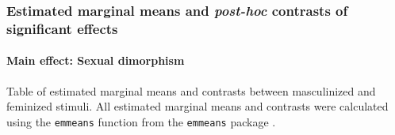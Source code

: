 \documentclass[
  bookmarksnumbered]{article}
\begin{document}
\begin{table}[H]
\centering
\caption{\label{tab:tab-mod1}ANOVA-type table of fixed effects for the DFF model}
\centering
{}
\end{table}

\subsubsection{\texorpdfstring{Estimated marginal means and \emph{post-hoc} contrasts of significant effects}{Estimated marginal means and post-hoc contrasts of significant effects}}\label{estimated-marginal-means-and-post-hoc-contrasts-of-significant-effects}

\paragraph{Main effect: Sexual dimorphism}\label{main-effect-sexual-dimorphism}

Table of estimated marginal means and contrasts between masculinized and feminized stimuli. All estimated marginal means and contrasts were calculated using the \texttt{emmeans} function from the \texttt{emmeans} package \autocite{emmeanscit}.
\end{document}

